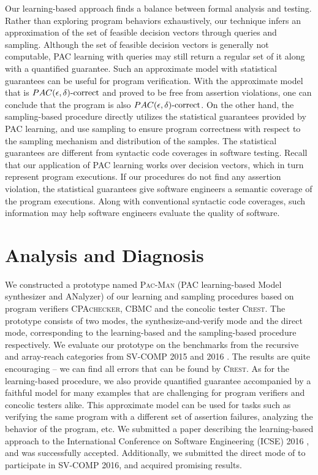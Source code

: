 Our learning-based approach finds a balance between formal analysis and testing. Rather than exploring program behaviors exhaustively, our technique infers an approximation of the set of feasible decision vectors through queries and sampling. Although the set of feasible decision vectors is generally not computable, PAC learning with queries may still return a regular set of it along with a quantified guarantee. Such an approximate model with statistical guarantees can be useful for program verification. With the approximate model that is $PAC(\epsilon, \delta)\text{-correct}$ and proved to be free from assertion violations, one can conclude that the program is also $PAC(\epsilon, \delta)\text{-correct}$. On the other hand, the sampling-based procedure directly utilizes the statistical guarantees provided by PAC learning, and use sampling to ensure program correctness with respect to the sampling mechanism and distribution of the samples. The statistical guarantees are different from syntactic code coverages in software testing. Recall that our application of PAC learning works over decision vectors, which in turn represent program executions. If our procedures do not find any assertion violation, the statistical guarantees give software engineers a semantic coverage of the program executions. Along with conventional syntactic code coverages, such information may help software engineers evaluate the quality of software.

\section{Analysis and Diagnosis}\label{sec:analysis_diagnosis}

We constructed a prototype named \textsc{Pac-Man} (PAC learning-based Model synthesizer and ANalyzer) of our learning and sampling procedures based on program verifiers \textsc{CPAchecker, CBMC} and the concolic tester \textsc{Crest}. The prototype consists of two modes, the synthesize-and-verify mode and the direct mode, corresponding to the learning-based and the sampling-based procedure respectively. We evaluate our prototype on the benchmarks from the recursive and  array-reach categories from SV-COMP 2015 \cite{svcomp15} and 2016 \cite{svcomp16}. The results are quite encouraging -- we can find all errors that can be found by \textsc{Crest}. As for the learning-based procedure, we also provide quantified guarantee accompanied by a faithful model for many examples that are challenging for program verifiers and concolic testers alike. This approximate model can be used for tasks such as verifying the same program with a different set of assertion failures, analyzing the behavior of the program, etc. We submitted a paper describing the learning-based approach \cite{ChenHLLTWW16} to the International Conference on Software Engineering (ICSE) 2016 \cite{icse2016}, and was successfully accepted. Additionally, we submitted the direct mode of \PACMAN to participate in SV-COMP 2016, and acquired promising results. 

